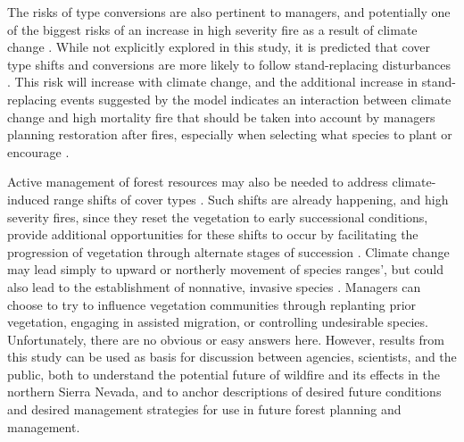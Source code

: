 The risks of type conversions are also pertinent to managers, and potentially one of the biggest risks of an increase in high severity fire as a result of climate change \citep{Stephens2013,Mallek2014}. While not explicitly explored in this study, it is predicted that cover type shifts and conversions are more likely to follow stand-replacing disturbances \citep{Stephens2013}. This risk will increase with climate change, and the additional increase in stand-replacing events suggested by the model indicates an interaction between climate change and high mortality fire that should be taken into account by managers planning restoration after fires, especially when selecting what species to plant or encourage \citep{Fule2008,Schwartz2015}. 

Active management of forest resources may also be needed to address climate-induced range shifts of cover types \citep{Keane2009}. Such shifts are already happening, and high severity fires, since they reset the vegetation to early successional conditions, provide additional opportunities for these shifts to occur by facilitating the progression of vegetation through alternate stages of succession \citep{Bachelet2001}. Climate change may lead simply to upward or northerly movement of species ranges’, but could also lead to the establishment of nonnative, invasive species \citep{McKenzie2004}. Managers can choose to try to influence vegetation communities through replanting prior vegetation, engaging in assisted migration, or controlling undesirable species. 
Unfortunately, there are no obvious or easy answers here. However, results from this study can be used as basis for discussion between agencies, scientists, and the public, both to understand the potential future of wildfire and its effects in the northern Sierra Nevada, and to anchor descriptions of desired future conditions and desired management strategies for use in future forest planning and management.






